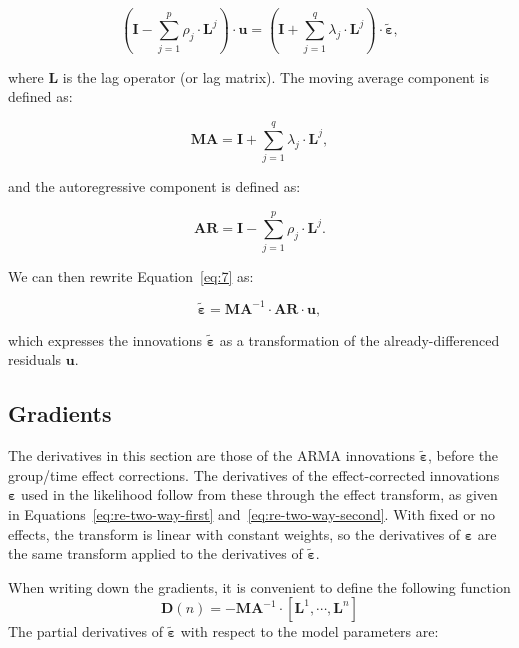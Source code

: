 \documentclass[12pt]{article}
\begin{document}
\begin{equation}
\left( \mathbf{I} - \sum_{j = 1}^{p} \rho_{j} \cdot \mathbf{L}^{j} \right) \cdot \mathbf{u}
= \left( \mathbf{I} + \sum_{j = 1}^{q} \lambda_{j} \cdot \mathbf{L}^{j} \right) \cdot \tilde{\boldsymbol{\varepsilon}},
\label{eq:7}
\end{equation}

where $\mathbf{L}$ is the lag operator (or lag matrix). The moving average component is defined as:

\begin{equation}
\mathbf{MA} = \mathbf{I} + \sum_{j = 1}^{q} \lambda_{j} \cdot \mathbf{L}^{j},
\label{eq:8}
\end{equation}

and the autoregressive component is defined as:

\begin{equation}
\mathbf{AR} = \mathbf{I} - \sum_{j = 1}^{p} \rho_{j} \cdot \mathbf{L}^{j}.
\label{eq:9}
\end{equation}

We can then rewrite Equation~\ref{eq:7} as:

\begin{equation}
\tilde{\boldsymbol{\varepsilon}}
= \mathbf{MA}^{-1} \cdot \mathbf{AR} \cdot \mathbf{u},
\label{eq:arima_matrix}
\end{equation}

which expresses the innovations $\tilde{\boldsymbol{\varepsilon}}$ as a transformation of the already-differenced residuals $\mathbf{u}$.

\subsection*{Gradients}
The derivatives in this section are those of the ARMA innovations $\tilde{\boldsymbol{\varepsilon}}$, before the group/time effect corrections. The derivatives of the effect-corrected innovations $\boldsymbol{\varepsilon}$ used in the likelihood follow from these through the effect transform, as given in Equations~\ref{eq:re-two-way-first} and~\ref{eq:re-two-way-second}. With fixed or no effects, the transform is linear with constant weights, so the derivatives of $\boldsymbol{\varepsilon}$ are the same transform applied to the derivatives of $\tilde{\boldsymbol{\varepsilon}}$.

When writing down the gradients, it is convenient to define the following function
\begin{equation}
\mathbf{D}(n)
= - \mathbf{MA}^{-1} \cdot [\mathbf{L}^{1}, \cdots ,\mathbf{L}^{n}]
\label{eq:MA_func}
\end{equation}
The partial derivatives of $\tilde{\boldsymbol{\varepsilon}}$ with respect to the model parameters are:
\end{document}
